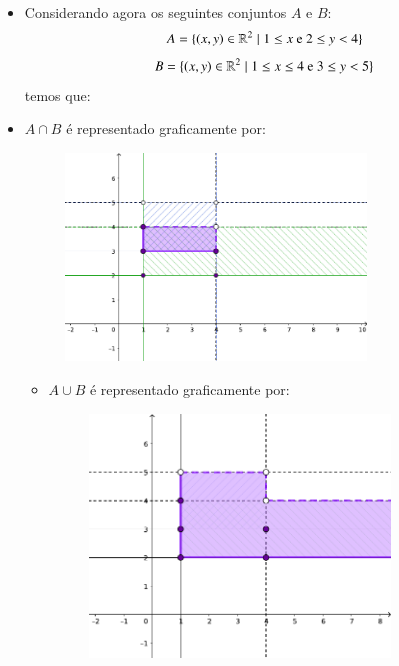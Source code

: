 \begin{itemize}
 \item Considerando agora os seguintes conjuntos $A$ e $B$:
 \[A= \{(x, y) \in \mathbb{R}^2 \mid 1 \leq x \text{ e } 2 \leq y < 4 \}\]
 \[B= \{(x, y) \in \mathbb{R}^2 \mid 1 \leq x \leq 4 \text{ e } 3 \leq y < 5 \}\]
 temos que:
  
 \item $A \cap B$ é representado graficamente por:
    \begin{figure}[H]
 \centering
 \includegraphics[width=8cm]{../Topicos/Figuras/cartesianointersecao.pdf}
 \end{figure}
 
 \begin{itemize}
 \item $A \cup B$ é representado graficamente por:
    \begin{figure}[H]
 \centering
 \includegraphics[width=8cm]{../Topicos/Figuras/cartesianouniao.pdf}
 \end{figure}
 
 \end{itemize}
 
 
\end{itemize}

